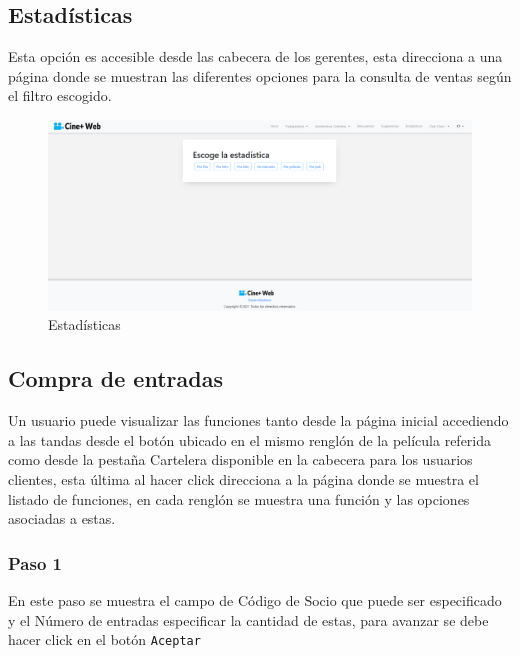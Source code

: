\subsection{Estad\'isticas}
Esta opci\'on es accesible desde las cabecera de los gerentes, esta direcciona a una p\'agina donde se muestran las diferentes opciones para la consulta de ventas seg\'un el filtro escogido.
\newpage
\begin{figure}[h!]
	\centering
	\includegraphics[scale=0.35]{./chapters/img/statistics.png}
	
	\label{fig:statistics}
	\caption{Estad\'isticas}
	
\end{figure}
\subsection{Compra de entradas}
Un usuario puede visualizar las funciones tanto desde la p\'agina inicial accediendo a las tandas desde el bot\'on ubicado en el mismo rengl\'on de la pel\'icula referida como desde la pesta\~na Cartelera disponible en la cabecera para los usuarios clientes, esta \'ultima al hacer click direcciona a la p\'agina donde se muestra el listado de funciones, en cada rengl\'on se muestra una funci\'on y las opciones asociadas a estas.\\

\subsubsection{Paso 1}
En este paso se muestra el campo de C\'odigo de Socio que puede ser especificado y el N\'umero de entradas especificar la cantidad de estas, para avanzar se debe hacer click en el bot\'on \verb*|Aceptar|\\

